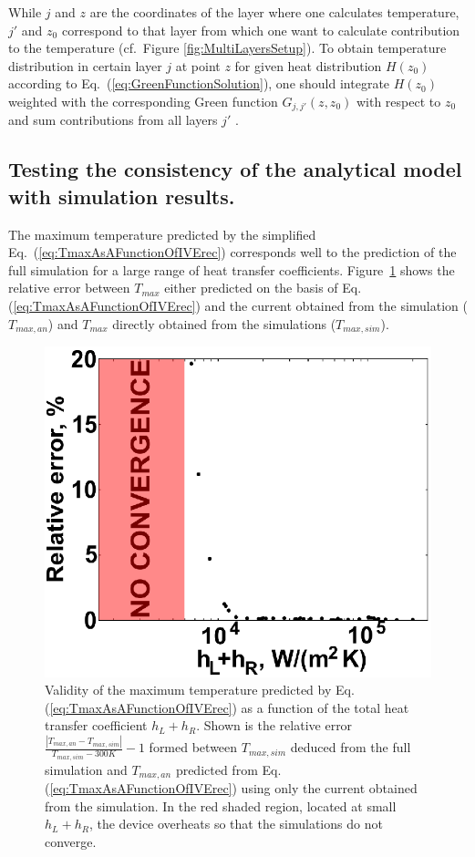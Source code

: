 \documentclass[%
9pt,
 aip,
rsi,%
 amsmath,amssymb,
preprint,%
]{revtex4-1}
\begin{document}
While $j$ and $z$ are the coordinates of the layer where one calculates temperature, $j'$ and $z_0$ correspond to that layer from which one want to calculate contribution to the temperature (cf.~Figure \ref{fig:MultiLayersSetup}). 
To obtain temperature distribution in certain layer $j$ at point $z$ for given heat distribution $H(z_0)$ according to Eq.~(\ref{eq:GreenFunctionSolution}), one should integrate $H(z_0)$ weighted with the corresponding Green function $G_{j,j'}(z,z_0)$ with respect to $z_0$ and sum contributions from all layers $j'$ . 

\subsection*{Testing the consistency of the analytical model with simulation results.}

The maximum temperature predicted by the simplified Eq.~(\ref{eq:TmaxAsAFunctionOfIVErec}) corresponds well to the prediction of the full simulation for a large range of heat transfer coefficients.
Figure~\ref{fig:connection_to_experiment} shows the relative error between $T_{max}$ either predicted on the basis of Eq.(\ref{eq:TmaxAsAFunctionOfIVErec}) and the current obtained from the simulation ($T_{max,an}$) and $T_{max}$ directly obtained from the simulations ($T_{max,sim}$).

\begin{figure}[h]
	\centering
    \includegraphics{General_plots_2.eps}
    \caption{Validity of the maximum temperature predicted by Eq.(\ref{eq:TmaxAsAFunctionOfIVErec}) as a function of the total heat transfer coefficient $h_L + h_R$. Shown is the relative error $\frac{|T_{max,an} - T_{max,sim}| }{T_{max,sim}-300K} - 1$ formed between $T_{max,sim}$ deduced from the full simulation and $T_{max,an}$ predicted from Eq.(\ref{eq:TmaxAsAFunctionOfIVErec}) using only the current obtained from the simulation. In the red shaded region, located at small $h_L + h_R$, the device overheats so that the simulations do not converge.}
    \label{fig:connection_to_experiment}
\end{figure}
\end{document}
